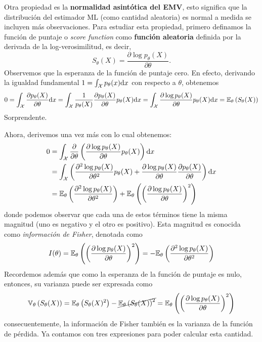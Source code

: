 Otra propiedad es la \textbf{normalidad asintótica del EMV}, esto significa que la distribución del estimador ML (como cantidad aleatoria) es normal a medida se incluyen más observaciones. Para estudiar esta propiedad, primero definamos la función de puntaje o \textit{score function} como \textbf{función aleatoria }definida por la derivada de la log-verosimilitud, es decir, 
\begin{equation}
	S_\theta(X) = \frac{\partial \log p_\theta(X)}{\partial\theta}.
\end{equation}
Observemos que la esperanza de la función de puntaje cero. En efecto, derivando la igualdad fundamental $1 = \int_{\mathcal X} p_\theta(x){\text{d}x}$ con respecto a $\theta$, obtenemos 
\begin{align}
	0 = \int_{\mathcal X} \frac{\partial  p_\theta(X)}{\partial\theta} {\text{d}x} = \int_{\mathcal X} \frac{1}{p_\theta(X)}\frac{\partial  p_\theta(X)}{\partial\theta} p_\theta(X) {\text{d}x} = \int_{\mathcal X} \frac{\partial \log   p_\theta(X)}{\partial\theta} p_\theta(X) {\text{d}x} = \mathbb{E}_\theta \left(S_\theta(X)\right)
\end{align}
Sorprendente. 

Ahora, derivemos una vez más con lo cual obtenemos: 
\begin{align*}
	0 &= \int_{\mathcal X} \frac{\partial}{\partial \theta }\left(\frac{\partial \log   p_\theta(X)}{\partial\theta} p_\theta(X) \right){\text{d}x}\\ 
	&= \int_{\mathcal X} \left(\frac{\partial^2 \log   p_\theta(X)}{\partial\theta^2} p_\theta(X) + \frac{\partial \log   p_\theta(X)}{\partial\theta}\frac{\partial   p_\theta(X)}{\partial\theta}  \right){\text{d}x}\\
	&= \mathbb{E}_\theta \left(\frac{\partial^2 \log   p_\theta(X)}{\partial\theta^2}\right) + \mathbb{E}_\theta \left(\left(\frac{\partial \log   p_\theta(X)}{\partial\theta}\right)^2\right)
\end{align*}
donde podemos observar que cada una de estos términos tiene la misma magnitud (uno es negativo y el otro es positivo). Esta magnitud es conocida como \textit{información de Fisher}, denotada como 
\begin{equation}
		I(\theta) = \mathbb{E}_\theta \left(\left(\frac{\partial \log   p_\theta(X)}{\partial\theta}\right)^2\right) = 	-\mathbb{E}_\theta \left(\frac{\partial^2 \log   p_\theta(X)}{\partial\theta^2}\right)
\end{equation}	
Recordemos además que como la esperanza de la función de puntaje es nulo, entonces, su varianza puede ser expresada como 
\begin{equation}
	\mathbb{V}_\theta \left(S_\theta(X)\right) = \mathbb{E}_\theta \left(S_\theta(X)^2\right) - \cancel{\mathbb{E}_\theta \left(S_\theta(X)\right)^2} = \mathbb{E}_\theta \left(\left(\frac{\partial \log   p_\theta(X)}{\partial\theta}\right)^2\right)
\end{equation}
consecuentemente, la información de Fisher también es la varianza de la función de pérdida. Ya contamos con tres expresiones para poder calcular esta cantidad. 

